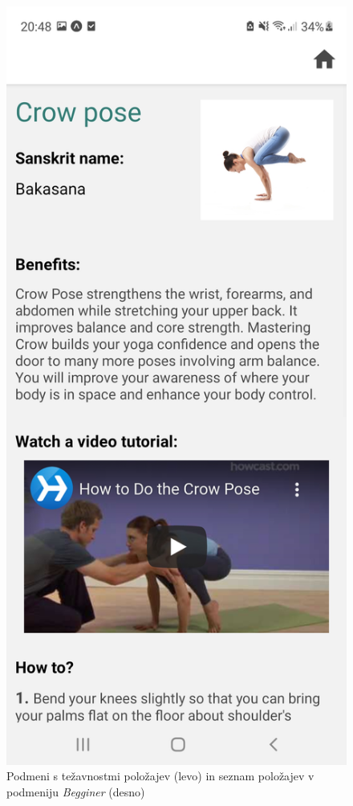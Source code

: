 \documentclass[a4paper, 12pt]{book}
\begin{document}
\begin{figure}[!htbp]
\begin{minipage}[b]{0.32\textwidth}
  \end{minipage}
    \caption{Podmeni s težavnostmi položajev (levo) in seznam položajev v podmeniju \textit{Begginer} (desno)}
    \label{asana}
    \begin{minipage}[b]{0.32\textwidth}
    \includegraphics[width=\textwidth]{crowposeasana.jpg}\centering

\end{minipage}
\end{figure}
\end{document}
